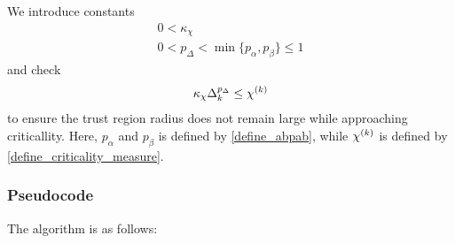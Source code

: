 We introduce constants
\begin{align}
0 < \kappa_{\chi} \label{define_kappa_chi} \\
0 < p_{\Delta} < \min\{p_{\alpha}, p_{\beta}\} \le 1 \label{define_p_delta} 
\end{align}
and check
\begin{align}
\kappa_{\chi} \Delta_k^{p_{\Delta}} \le {\chi^{(k)}} \label{criticallity_check}
\end{align}
to ensure the trust region radius does not remain large while approaching criticallity.
Here,
$p_{\alpha}$ and $p_{\beta}$ is defined by \cref{define_abpab},
while ${\chi^{(k)}}$ is defined by \cref{define_criticality_measure}.



\subsubsection{Pseudocode}
The algorithm is as follows:

